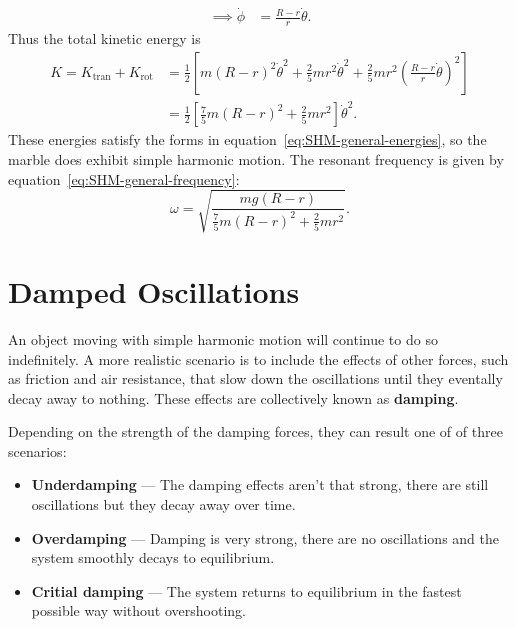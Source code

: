 \documentclass[../classical_mechanics.tex]{subfiles}
\begin{document}
\begin{example}
\begin{align}
                \implies\dot{\phi}&=\frac{R-r}{r}\dot{\theta}.
            \end{align}
            Thus the total kinetic energy is
            \begin{align}
                K=K_\text{tran}+K_\text{rot}&=\frac{1}{2}\left[m(R-r)^2\dot{\theta}^2+\frac{2}{5}mr^2\dot{\theta}^2+\frac{2}{5}mr^2\left(\frac{R-r}{r}\dot{\theta}\right)^2\right]\\
                &=\frac{1}{2}\left[\frac{7}{5}m(R-r)^2+\frac{2}{5}mr^2\right]\dot{\theta}^2.
            \end{align}
            These energies satisfy the forms in equation~\ref{eq:SHM-general-energies}, so the marble does exhibit simple harmonic motion.
            The resonant frequency is given by equation~\ref{eq:SHM-general-frequency}:
            \begin{equation}
                \omega=\sqrt{\frac{mg(R-r)}{\frac{7}{5}m(R-r)^2+\frac{2}{5}mr^2}}.
            \end{equation}
        \end{example}

    \section{Damped Oscillations}\label{sec:damped-oscillations}
        An object moving with simple harmonic motion will continue to do so indefinitely.
        A more realistic scenario is to include the effects of other forces, such as friction and air resistance, that slow down the oscillations until they eventally decay away to nothing.
        These effects are collectively known as \textbf{damping}.
    
        Depending on the strength of the damping forces, they can result one of of three scenarios:
        \begin{itemize}
            \item \textbf{Underdamping} --- The damping effects aren't that strong, there are still oscillations but they decay away over time.
            \item \textbf{Overdamping} --- Damping is very strong, there are no oscillations and the system smoothly decays to equilibrium.
            \item \textbf{Critial damping} --- The system returns to equilibrium in the fastest possible way without overshooting.
        \end{itemize}
\end{document}
